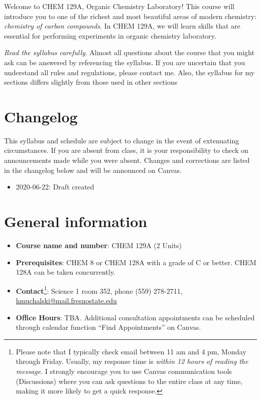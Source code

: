 \newpage

Welcome to CHEM 129A, Organic Chemistry Laboratory! This course will
introduce you to one of the richest and most beautiful areas of modern
chemistry: \emph{chemistry of carbon compounds}. In CHEM 129A, we will
learn skills that are essential for performing experiments in organic
chemistry laboratory.

\emph{Read the syllabus carefully}. Almost all questions about the
course that you might ask can be answered by referencing the syllabus.
If you are uncertain that you understand all rules and regulations,
please contact me. Also, the syllabus for my sections differs slightly
from those used in other sections

\hypertarget{changelog}{%
\section{Changelog}\label{changelog}}

This syllabus and schedule are subject to change in the event of
extenuating circumstances. If you are absent from class, it is your
responsibility to check on announcements made while you were absent.
Changes and corrections are listed in the changelog below and will be
announced on Canvas.

\begin{itemize}
\tightlist
\item
  2020-06-22: Draft created
\end{itemize}

\hypertarget{general-information}{%
\section{General information}\label{general-information}}

\begin{itemize}
\tightlist
\item
  \textbf{Course name and number}: CHEM 129A (2 Units)
\item
  \textbf{Prerequisites}: CHEM 8 or CHEM 128A with a grade of C or
  better. CHEM 128A can be taken concurrently.
\item
  \textbf{Contact}\footnote{Please note that I typically check email
    between 11 am and 4 pm, Monday through Friday. Usually, my response
    time is \emph{within 12 hours of reading the message}. I strongly
    encourage you to use Canvas communication tools (Discussions) where
    you can ask questions to the entire class at any time, making it
    more likely to get a quick response.}: Science 1 room 352, phone
  (559) 278-2711, \url{hmuchalski@mail.fresnostate.edu}
\item
  \textbf{Office Hours}: TBA. Additional consultation appointments can
  be scheduled through calendar function ``Find Appointments'' on
  Canvas.
\end{itemize}

